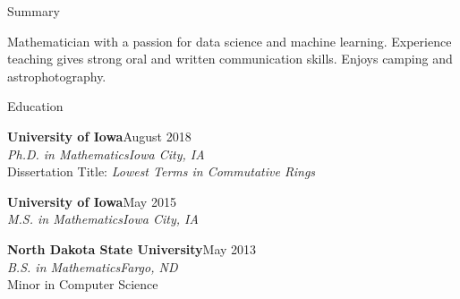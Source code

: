 \documentclass{resume} %
\begin{document}

\begin{rSection}{Summary}

Mathematician with a passion for data science and machine learning. Experience teaching gives strong oral and written communication skills. Enjoys camping and astrophotography.

\end{rSection}





\begin{rSection}{Education}

{\bf University of Iowa}\hfill August 2018\\
{\em Ph.D. in Mathematics}\hfill {\em Iowa City, IA}\\
Dissertation Title: {\sl Lowest Terms in Commutative Rings}

{\bf University of Iowa}\hfill May 2015\\
{\em M.S. in Mathematics}\hfill {\em Iowa City, IA}

{\bf North Dakota State University}\hfill May 2013\\
{\em B.S. in Mathematics}\hfill {\em Fargo, ND}\\
Minor in Computer Science


\end{rSection}
\end{document}
